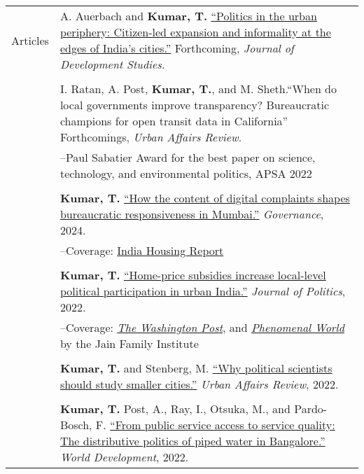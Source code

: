 \documentclass[letterpaper, 10.5pt]{article}
\begin{document}
\begin{longtable}{p{1.5in}p{5in}}
\nohyphens{{Articles}} 

& A. Auerbach and \textbf{Kumar, T.} \href{https://doi.org/10.1080/00220388.2025.2521492}{``Politics in the urban periphery: Citizen-led expansion and informality at the edges of India's cities.''} Forthcoming, \textit{Journal of Development Studies}.\\
& \\

&I. Ratan, A. Post, \textbf{Kumar, T.}, and M. Sheth.``When do local governments improve transparency? 
Bureaucratic champions for open transit data in California''  Forthcomings, \textit{Urban Affairs Review}.\\

&--\indent Paul Sabatier Award for the best paper on science, technology, and environmental politics, APSA 2022\\


& \\

&\textbf{Kumar, T.} \href{https://onlinelibrary.wiley.com/doi/10.1111/gove.12889}{``How the content of digital complaints shapes bureaucratic responsiveness in Mumbai.''}   \textit{\textit{Governance}}, 2024. \\
&--\indent Coverage: \href{https://indiahousingreport.in/outputs/opinion/how-the-content-of-demands-shapes-government-responsiveness-excerpts-from-a-discussion/}{India Housing Report}\\
& \\
& \textbf{Kumar, T.} \href{https://doi.org/10.1086/715605}{``Home-price subsidies increase local-level political participation in urban India.''} \textit{Journal of Politics}, 2022.\\
& --\indent Coverage: \href{https://www.washingtonpost.com/news/monkey-cage/wp/2019/01/31/heres-what-gavin-newsom-elizabeth-warren-and-microsoft-should-know-if-want-to-end-the-affordable-housing-crisis/?tid=sm_tw_cage}{\textit{The Washington Post}}, and \href{https://www.phenomenalworld.org/sources/original-and-forgery/}{\textit{Phenomenal World}} by the Jain Family Institute  \\
& \\
& \textbf{Kumar, T.} and Stenberg, M. \href{https://doi.org/10.1177/10780874221124610}{``Why political scientists should study smaller cities.''}  \textit{Urban Affairs Review}, 2022. \\
& \\

& \textbf{Kumar, T.}  Post, A., Ray, I., Otsuka, M., and Pardo-Bosch, F. \href{https://doi.org/10.1016/j.worlddev.2021.105736}{``From public service access to service quality: The distributive politics of piped water in Bangalore.''} \textit{World Development}, 2022. \\


\end{longtable}
\end{document}
